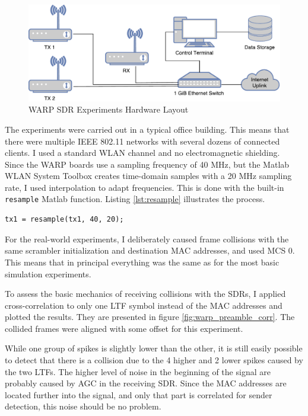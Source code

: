 \begin{figure}[H]
	\centering
	\includegraphics[width=\textwidth]{gfx/images/warp-layout}
	\caption{WARP SDR Experiments Hardware Layout}
	\label{fig:warp-layout}
\end{figure}

The experiments were carried out in a typical office building. This means that there were multiple IEEE 802.11 networks with several dozens of connected clients. I used a standard WLAN channel and no electromagnetic shielding.\\

Since the \gls{WARP} boards use a sampling frequency of 40 MHz, but the Matlab WLAN System Toolbox creates time-domain samples with a 20 MHz sampling rate, I used interpolation to adapt frequencies. This is done with the built-in \texttt{resample} Matlab function. Listing \ref{lst:resample} illustrates the process.

\begin{lstlisting}[captionpos=b,caption={Interpolate Sampling Rate},label=lst:resample]
% Interpolate to get from 20 to 40 MHz sampling rate
tx1 = resample(tx1, 40, 20);
\end{lstlisting}

For the real-world experiments, I deliberately caused frame collisions with the same scrambler initialization and destination \gls{MAC} addresses, and used \gls{MCS} 0. This means that in principal everything was the same as for the most basic simulation experiments.

To assess the basic mechanics of receiving collisions with the \glspl{SDR}, I applied cross-correlation to only one \gls{LTF} symbol instead of the \gls{MAC} addresses and plotted the results. They are presented in figure \ref{fig:warp_preamble_corr}. The collided frames were aligned with some offset for this experiment.

While one group of spikes is slightly lower than the other, it is still easily possible to detect that there is a collision due to the 4 higher and 2 lower spikes caused by the two \glspl{LTF}. The higher level of noise in the beginning of the signal are probably caused by \gls{AGC} in the receiving \gls{SDR}. Since the \gls{MAC} addresses are located further into the signal, and only that part is correlated for sender detection, this noise should be no problem.

